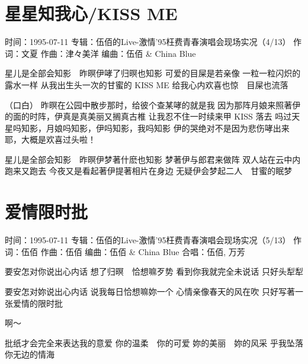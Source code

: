 \documentclass[UTF8,a4paper,oneside,twocolumn,12pt]{ctexbook}
\newcommand{\infopair}[2]{\textbullet #1：#2}
\newcommand{\zc}[1][伍佰]{\infopair{作词}{#1}}
\newcommand{\zq}[1][伍佰]{\infopair{作曲}{#1}}
\newcommand{\bq}[1][伍佰]{\infopair{编曲}{#1}}
\newcommand{\zj}[1]{\infopair{专辑}{#1}}
\newcommand{\sj}[1]{\infopair{时间}{#1}}
\newenvironment{info}{\begin{flushleft}\kaishu
	}
	{\end{flushleft}\normalsize\yahei\par}
\newenvironment{lyric}{
	}
{}
\begin{document}
\section{星星知我心/KISS ME}
\begin{info}
	\sj{1995-07-11}
	\zj{伍佰的Live-激情'95枉费青春演唱会现场实况（4/13）}
	\zc[文夏] %
	\zq[津々美洋]
	\bq[伍佰 \& China Blue]
\end{info}
\begin{lyric}
	星儿是全部会知影　昨暝伊哮了归暝也知影
	可爱的目屎是若亲像
	一粒一粒闪炽的露水一样
	从我出生头一次的甘蜜的 KISS ME
	给我心内欢喜也惊　目屎也流落

	（口白）
	昨暝在公园中散步那时，给彼个查某哮的就是我
	因为那阵月娘来照著伊的面的时阵，伊真是真美丽又搁真古椎
	让我忍不住一时续来甲 KISS 落去
	吗过天星吗知影，月娘吗知影，伊吗知影，我吗知影
	伊的哭绝对不是因为悲伤哮出来耶，大概是欢喜过头啦！

	星儿是全部会知影　昨暝伊梦著什麽也知影
	梦著伊与郎君来做阵
	双人站在云中内跑来又跑去
	今夜又是看起著伊提著相片在身边
	无疑伊会梦起二人　甘蜜的眠梦
\end{lyric}

\section{爱情限时批}
\begin{info}
	\sj{1995-07-11}
	\zj{伍佰的Live-激情'95枉费青春演唱会现场实况（5/13）}
	\zc
	\zq
	\bq[伍佰 \& China Blue]
	\infopair{合唱}{伍佰, 万芳}
\end{info}
\begin{lyric}
	要安怎对你说出心内话
	想了归暝　恰想嘛歹势
	看到你我就完全未说话
	只好头犁犁

	要安怎对妳说出心内话
	说我每日恰想嘛妳一个
	心情亲像春天的风在吹
	只好写著一张爱情的限时批

	啊～

	批纸才会完全来表达我的意爱
	你的温柔　你的可爱  妳的美丽　妳的风采
	乎我坠落你无边的情海
\end{lyric}
\end{document}
